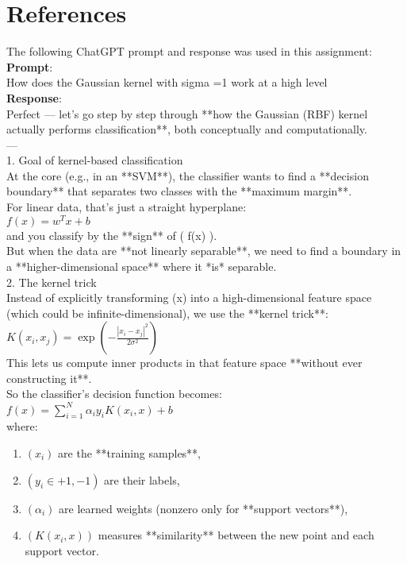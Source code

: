 \documentclass[12pt]{article}
\begin{document}
\section*{References}
The following ChatGPT prompt and response was used in this assignment:  \\
\textbf{Prompt}: \\
How does the Gaussian kernel with sigma =1 work at a high level  \\[1em]
\textbf{Response}: \\
Perfect — let's go step by step through **how the Gaussian (RBF) kernel actually performs classification**, both conceptually and computationally. \\
--- \\
1. Goal of kernel-based classification \\
At the core (e.g., in an **SVM**), the classifier wants to find a **decision boundary** that separates two classes with the **maximum margin**. \\
For linear data, that's just a straight hyperplane: \\
$f(x) = w^T x + b$ \\
and you classify by the **sign** of ( f(x) ). \\
But when the data are **not linearly separable**, we need to find a boundary in a **higher-dimensional space** where it *is* separable. \\
2. The kernel trick \\
Instead of explicitly transforming (x) into a high-dimensional feature space (which could be infinite-dimensional), we use the **kernel trick**: \\
$K(x_i, x_j) = \exp\left(-\frac{|x_i - x_j|^2}{2\sigma^2}\right)$ \\
This lets us compute inner products in that feature space **without ever constructing it**. \\
So the classifier's decision function becomes: \\
$f(x) = \sum_{i=1}^{N} \alpha_i y_i K(x_i, x) + b$ \\
where: \\
\begin{enumerate}
  \item $(x_i)$ are the **training samples**,
  \item $(y_i \in {+1, -1})$ are their labels,
  \item $(\alpha_i)$ are learned weights (nonzero only for **support vectors**),
  \item $(K(x_i, x))$ measures **similarity** between the new point and each support vector.
\end{enumerate}
\end{document}
